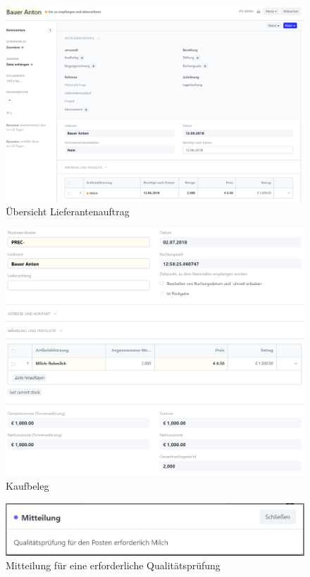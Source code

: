 \begin{figure}
  \centering
  \includegraphics[width=\textwidth]{Bilder/Uebersicht_Lieferantenauftrag.PNG}
  \caption{Übersicht Lieferantenauftrag}
  \label{fig:auftrUebersicht}
\end{figure}
\begin{figure}
  \centering
  \includegraphics[width=\textwidth]{Bilder/Kaufbeleg.PNG}
  \caption{Kaufbeleg}
  \label{fig:kaufbeleg}
\end{figure}
\begin{figure}
  \centering
  \includegraphics[width=\textwidth]{Bilder/Mitteilung_Qualitaetspruefung.PNG}
  \caption{Mitteilung für eine erforderliche Qualitätsprüfung}
  \label{fig:mittQual}
\end{figure}

